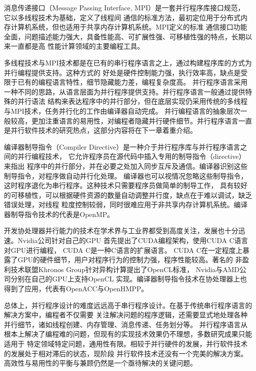 消息传递接口（Message Passing Interface, MPI）是一套并行程序库接口规范，
它以多线程技术为基础，定义了线程间
通信的标准方法，最初定位用于分布式内存计算机系统，但也适用于共享内存计算机系统。MPI定义的标准
通信接口功能全面，问题描述能力强大，具备性能高、可扩展性强、可移植性强的特点，长期以来一直都是高
性能计算领域的主要编程工具。

多线程技术与MPI技术都是在已有的串行程序语言之上，通过构建程序库的方式为并行编程提供支持。这种方式的
好处是硬件控制能力强，执行效率高，缺点是受限于已有的编程语言特性，细节隐藏能力差，编程复杂度高。
并行程序语言采用一种不同的思路，从语言层面为并行程序提供支持。并行程序语言一般通过提供特殊的并行语法
结构来表达程序中的并行部分，但在底层实现仍采用传统的多线程与MPI技术，任务并行化的工作由编译器自动完成。
并行编程语言的抽象层次一般较高，更加注重语言的易用性，对编程者隐藏并行硬件细节。并行程序语言一直
是并行软件技术的研究热点，这部分内容将在下一章着重介绍。

编译器制导指令（Compiler Directive）是一种介于并行程序库与并行程序语言之间的并行编程技术，
它允许程序员在源代码中插入专用的制导指令（directive）来指出
程序中的并行部分，并在必要之处加入同步互斥及通信。编译器识别这些制导指令，对程序做自动并行化处理。
编译器也可以视情况忽略这些制导指令，这时程序退化为串行程序。这种技术只需要程序员做简单的制导工作，
具有较好的可移植性，可以根据硬件资源的数量自动调整并行度，缺点在于难以调试，缺乏错误处理，对线程
粒度控制较弱，同时很难应用于非共享内存计算机系统。编译器制导指令技术的代表是OpenMP。

开发协处理器并行能力的技术在学术界与工业界都受到高度关注，发展也十分迅速。Nvidia公司针对自己的GPU
首先提出了CUDA编程架构，使用CUDA C语言对GPU进行编程，
CUDA C是一种C语言的扩展语言。
CUDA C在一定程度上暴露了GPU的硬件细节，用户对程序行为的控制力强，程序性能较高。著名的
非盈利技术联盟Khronos Group针对异构计算提出了OpenCL标准，
Nvidia与AMD公司分别在自己的GPU上支持OpenCL
实现。编译器制导指令技术在协处理器上也得到了应用，代表有OpenACC与OpenHMPP。

总体上，并行程序设计的难度远远高于串行程序设计。在基于传统串行程序语言的解决方案中，编程者不仅需要
关注解决问题的程序逻辑，还需要显式地处理各种并行细节，诸如线程创建、内存管理、消息传递、任务划分等。
并行程序语言从根本上解决了编程难的问题，但现有的实现技术效果仍不理想，多数研究成果只能适用于
特定领域特定问题，通用性有限。相较于并行硬件的发展，并行软件技术的发展处于相对滞后的状态，现阶段
并行软件技术还没有一个完美的解决方案。高效性与易用性的平衡与兼顾仍然是一个亟待解决的关键问题。

